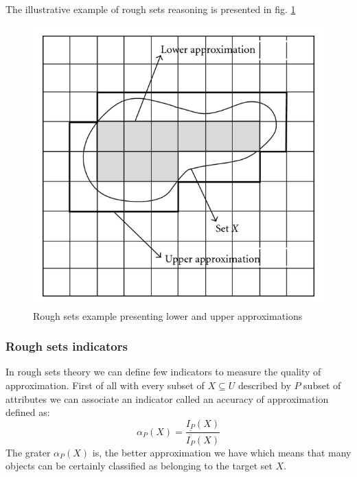 The illustrative example of rough sets reasoning is presented in fig. \ref{fig:rough_set_example}
\begin{figure}[H] 
    \begin{center}
        \includegraphics{fig/rough_set.png}
    \end{center}
    \caption{Rough sets example presenting lower and upper approximations}
    \label{fig:rough_set_example}
\end{figure}

\subsubsection{Rough sets indicators}
\label{cha:Rough_sets_indicators}
In rough sets theory we can define few indicators to measure the quality of
approximation. First of all with every 
subset of $X \subseteq U$ described by $P$ subset of attributes we can 
associate an indicator called an accuracy of approximation defined as:
\begin{equation}
    \alpha_P(X)=\frac{\underline{I_P}(X)}{\overline{I_P}(X)}
    \label{eq:accuracy_approximation}
\end{equation}
The grater $\alpha_P(X)$ is, the better approximation we have which means that
many objects can be certainly classified as belonging to the target set $X$.

